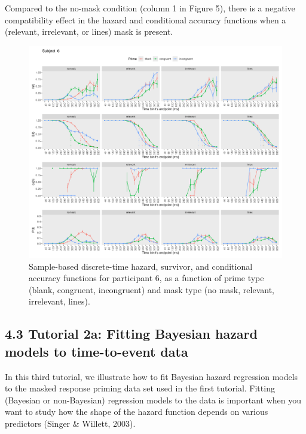 \documentclass[
  man,floatsintext]{apa6}
\begin{document}
Compared to the no-mask condition (column 1 in Figure 5), there is a negative compatibility effect in the hazard and conditional accuracy functions when a (relevant, irrelevant, or lines) mask is present.



\begin{figure}[H]

{\centering \includegraphics[width=0.95\linewidth,height=0.67\textheight,]{../Tutorial_1_descriptive_stats/figures/Plot_2IV_for_subject6_PanisSchmidt} 

}

\caption{Sample-based discrete-time hazard, survivor, and conditional accuracy functions for participant 6, as a function of prime type (blank, congruent, incongruent) and mask type (no mask, relevant, irrelevant, lines).}\label{fig:plot-2ivs}
\end{figure}

\subsection{4.3 Tutorial 2a: Fitting Bayesian hazard models to time-to-event data}\label{tutorial-2a-fitting-bayesian-hazard-models-to-time-to-event-data}

In this third tutorial, we illustrate how to fit Bayesian hazard regression models to the masked response priming data set used in the first tutorial. Fitting (Bayesian or non-Bayesian) regression models to the data is important when you want to study how the shape of the hazard function depends on various predictors (Singer \& Willett, 2003).
\end{document}
